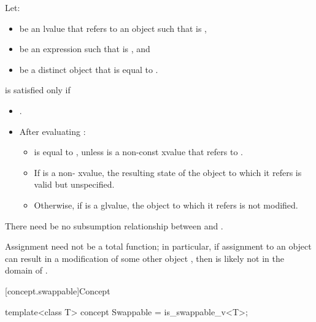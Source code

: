 \begin{itemdescr}
\pnum
Let:
\begin{itemize}
\item {} be an lvalue that refers to an object  such that
   is ,
\item {} be an expression such that  is
  , and
\item {} be a distinct object that is equal to .
\end{itemize}
 is satisfied only if

\begin{itemize}
\item {}.

\item After evaluating :

\begin{itemize}
\item {} is equal to , unless  is a non-const
xvalue that refers to .

\item If  is a non- xvalue, the resulting state of the
object to which it refers is valid but unspecified.

\item Otherwise, if  is a glvalue, the object to which it refers is
  not modified.
\end{itemize}
\end{itemize}

\pnum
There need be no subsumption relationship between
and
.

\pnum
\begin{note}
Assignment need not be a total function;
in particular, if assignment to an object  can result in a modification
of some other object , then  is likely not in the domain
of \tcode{=}.
\end{note}
\end{itemdescr}

[concept.swappable]{Concept }

%
\begin{itemdecl}
template<class T>
  concept Swappable = is_swappable_v<T>;
\end{itemdecl}

